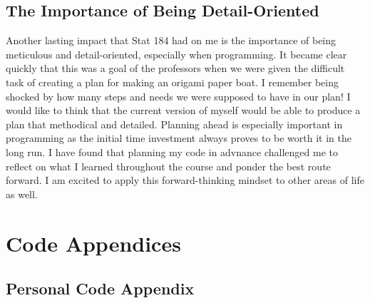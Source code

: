 \documentclass[
  letterpaper,
  DIV=11,
  numbers=noendperiod]{scrartcl}
\begin{document}
\subsection{The Importance of Being
Detail-Oriented}\label{the-importance-of-being-detail-oriented}

Another lasting impact that Stat 184 had on me is the importance of
being meticulous and detail-oriented, especially when programming. It
became clear quickly that this was a goal of the professors when we were
given the difficult task of creating a plan for making an origami paper
boat. I remember being shocked by how many steps and needs we were
supposed to have in our plan! I would like to think that the current
version of myself would be able to produce a plan that methodical and
detailed. Planning ahead is especially important in programming as the
initial time investment always proves to be worth it in the long run. I
have found that planning my code in advnance challenged me to reflect on
what I learned throughout the course and ponder the best route forward.
I am excited to apply this forward-thinking mindset to other areas of
life as well.

\newpage{}

\section{Code Appendices}\label{code-appendices}

\subsection{Personal Code Appendix}\label{personal-code-appendix}
\end{document}
